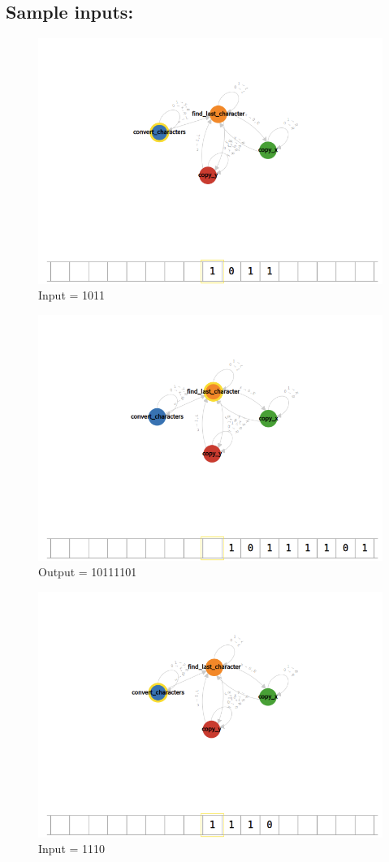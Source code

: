 \documentclass[12pt]{article}
\begin{document}
\subsection*{Sample inputs:}
\begin{figure}[H]
    \caption{Input = 1011}
    \centering
    \includegraphics[width=12cm]{Q2/1011.png}
\end{figure}
\begin{figure}[H]
    \caption{Output = 10111101}
    \centering
    \includegraphics[width=12cm]{Q2/10111101.png}
\end{figure}
\begin{figure}[H]
    \caption{Input = 1110}
    \centering
    \includegraphics[width=12cm]{Q2/1110.png}
\end{figure}
\end{document}
